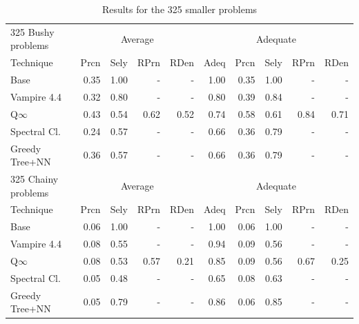 \documentclass[]{ceurart}
\begin{document}
\begin{table}
\centering
\begin{tabular}{|l|rrrr|r|rrrr|}
\hline
325 Bushy problems  & \multicolumn{4}{|c|}{Average} & \multicolumn{5}{|c|}{Adequate} \\
Technique       & Prcn & Sely & RPrn & RDen & Adeq & Prcn & Sely & RPrn & RDen \\
\hline
Base            & 0.35 & 1.00 &  -   &  -   & 1.00 & 0.35 & 1.00 &  -   &  -   \\
Vampire 4.4     & 0.32 & 0.80 &  -   &  -   & 0.80 & 0.39 & 0.84 &  -   &  -   \\
Q$\infty$       & 0.43 & 0.54 & 0.62 & 0.52 & 0.74 & 0.58 & 0.61 & 0.84 & 0.71 \\
Spectral Cl.    & 0.24 & 0.57 &  -   &  -   & 0.66 & 0.36 & 0.79 &  -   &  -   \\
Greedy Tree+NN  & 0.36 & 0.57 &  -   &  -   & 0.66 & 0.36 & 0.79 &  -   &  -   \\
\hline
\hline
325 Chainy problems & \multicolumn{4}{|c|}{Average} & \multicolumn{5}{|c|}{Adequate} \\
Technique       & Prcn & Sely & RPrn & RDen & Adeq & Prcn & Sely & RPrn & RDen \\
\hline
Base            & 0.06 & 1.00 &  -   &  -   & 1.00 & 0.06 & 1.00 &  -   &  -   \\
Vampire 4.4     & 0.08 & 0.55 &  -   &  -   & 0.94 & 0.09 & 0.56 &  -   &  -   \\
Q$\infty$       & 0.08 & 0.53 & 0.57 & 0.21 & 0.85 & 0.09 & 0.56 & 0.67 & 0.25 \\
Spectral Cl.    & 0.05 & 0.48 &  -   &  -   & 0.65 & 0.08 & 0.63 &  -   &  -   \\
Greedy Tree+NN  & 0.05 & 0.79 &  -   &  -   & 0.86 & 0.06 & 0.85 &  -   &  -   \\
\hline
\end{tabular}
\caption{Results for the 325 smaller problems}
\label{Results325}
\end{table}
\end{document}
